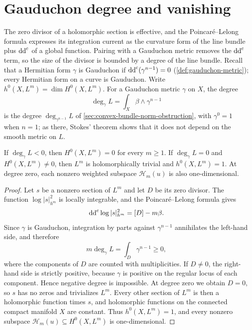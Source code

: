 \section{Gauduchon degree and vanishing}\label{sec:gauduchon-section-degree}

The zero divisor of a holomorphic section is effective, and the Poincar\'e--Lelong formula expresses its integration current as the curvature form of the line bundle plus $\mathrm{dd}^{\mathrm{c}}$ of a global function. Pairing with a Gauduchon metric removes the $\mathrm{dd}^{\mathrm{c}}$ term, so the size of the divisor is bounded by a degree of the line bundle. Recall that a Hermitian form $\gamma$ is Gauduchon if $\mathrm{dd}^{\mathrm{c}}(\gamma^{n-1})=0$ (\cref{def:gauduchon-metric}); every Hermitian form on a curve is Gauduchon. Write $h^0(X,L^m)=\dim H^0(X,L^m)$. For a Gauduchon metric $\gamma$ on $X$, the degree
\[
 \deg_\gamma L=\int_X\beta\wedge\gamma^{n-1}
\]
is the degree $\deg_{\gamma^{n-1}}L$ of \cref{sec:convex-bundle-norm-obstruction}, with $\gamma^0=1$ when $n=1$; as there, Stokes' theorem shows that it does not depend on the smooth metric on $L$.

\begin{theorem}\label{thm:gauduchon-section-obstruction}
If $\deg_\gamma L<0$, then $H^0(X,L^m)=0$ for every $m\geq1$. If $\deg_\gamma L=0$ and $H^0(X,L^m)\neq0$, then $L^m$ is holomorphically trivial and $h^0(X,L^m)=1$. At degree zero, each nonzero weighted subspace $\mathcal H_m(u)$ is also one-dimensional.
\end{theorem}
\begin{proof}
Let $s$ be a nonzero section of $L^m$ and let $D$ be its zero divisor. The function $\log|s|_{h^m}^2$ is locally integrable, and the Poincar\'e--Lelong formula gives
\[
 \mathrm{dd}^{\mathrm{c}}\log|s|_{h^m}^2=[D]-m\beta.
\]
Since $\gamma$ is Gauduchon, integration by parts against $\gamma^{n-1}$ annihilates the left-hand side, and therefore
\[
 m\deg_\gamma L=\int_D\gamma^{n-1}\geq0,
\]
where the components of $D$ are counted with multiplicities. If $D\neq0$, the right-hand side is strictly positive, because $\gamma$ is positive on the regular locus of each component. Hence negative degree is impossible. At degree zero we obtain $D=0$, so $s$ has no zeros and trivializes $L^m$. Every other section of $L^m$ is then a holomorphic function times $s$, and holomorphic functions on the connected compact manifold $X$ are constant. Thus $h^0(X,L^m)=1$, and every nonzero subspace $\mathcal H_m(u)\subseteq H^0(X,L^m)$ is one-dimensional.
\end{proof}

